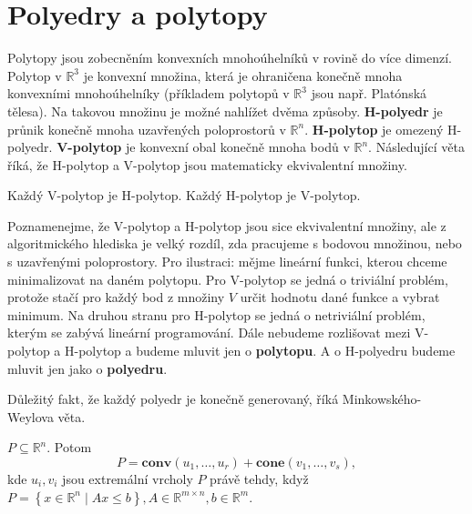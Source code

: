 \section{Polyedry a polytopy}

Polytopy jsou zobecněním konvexních mnohoúhelníků v rovině do více dimenzí. Polytop v $\mathbb{R}^3$ je konvexní množina, která je ohraničena konečně mnoha konvexními mnohoúhelníky (příkladem polytopů v $\mathbb{R}^3$ jsou např. Platónská tělesa). Na takovou množinu je možné nahlížet dvěma způsoby. \textbf{H-polyedr} je průnik konečně mnoha uzavřených poloprostorů v $\mathbb{R}^n$. \textbf{H-polytop} je omezený H-polyedr. \textbf{V-polytop} je konvexní obal konečně mnoha bodů v $\mathbb{R}^n$. Následující věta říká, že H-polytop a V-polytop jsou matematicky ekvivalentní množiny.

\begin{vt2}\cite{lectures-on-discrete-geometry}
    Každý V-polytop je H-polytop. Každý H-polytop je V-polytop.
\end{vt2}

Poznamenejme, že V-polytop a H-polytop jsou sice ekvivalentní množiny, ale z algoritmického hlediska je velký rozdíl, zda pracujeme s bodovou množinou, nebo s uzavřenými poloprostory. Pro ilustraci: mějme lineární funkci, kterou chceme minimalizovat na daném polytopu. Pro V-polytop se jedná o triviální problém, protože stačí pro každý bod z množiny $V$ určit hodnotu dané funkce a vybrat minimum. Na druhou stranu pro H-polytop se jedná o netriviální problém, kterým se zabývá lineární programování. Dále nebudeme rozlišovat mezi V-polytop a H-polytop a budeme mluvit jen o \textbf{polytopu}. A o H-polyedru budeme mluvit jen jako o \textbf{polyedru}.

Důležitý fakt, že každý polyedr je konečně generovaný, říká Minkowského-Weylova věta.
\begin{vt2}\cite{semidefinite-optimization-and-convex-algebraic-geometry}
    $P \subseteq \mathbb{R}^n$. Potom
    $$
        P = \textbf{conv}(u_1, \dots, u_r) + \textbf{cone}(v_1, \dots, v_s),
    $$
    kde $u_i, v_i$ jsou extremální vrcholy $P$ právě tehdy, když $P = \left\{ x \in \mathbb{R}^n \mid Ax \leq b \right\}, A \in \mathbb{R}^{m \times n}, b \in \mathbb{R}^m$.
\end{vt2}

